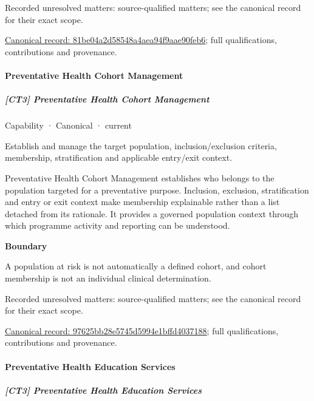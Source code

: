 {\small Recorded unresolved matters: source-qualified matters; see the canonical record for their exact scope.}\par
{\footnotesize \href{../../../../continuum/strategy/capability/81be04a2d58548a4aea94f9aae90feb6.md}{Canonical record: 81be04a2d58548a4aea94f9aae90feb6}; full qualifications, contributions and provenance.}\par
\paragraph{Preventative Health Cohort Management}

\subparagraph{[CT3] Preventative Health Cohort Management}

\label{element:97625bb28e5745d5994e1bffd4037188}
{\small Capability · Canonical · current}\par

Establish and manage the target population, inclusion/exclusion criteria, membership, stratification and applicable entry/exit context.



Preventative Health Cohort Management establishes who belongs to the population targeted for a preventative purpose. Inclusion, exclusion, stratification and entry or exit context make membership explainable rather than a list detached from its rationale. It provides a governed population context through which programme activity and reporting can be understood.



\textbf{Boundary}



A population at risk is not automatically a defined cohort, and cohort membership is not an individual clinical determination.


{\small Recorded unresolved matters: source-qualified matters; see the canonical record for their exact scope.}\par
{\footnotesize \href{../../../../continuum/strategy/capability/97625bb28e5745d5994e1bffd4037188.md}{Canonical record: 97625bb28e5745d5994e1bffd4037188}; full qualifications, contributions and provenance.}\par
\paragraph{Preventative Health Education Services}

\subparagraph{[CT3] Preventative Health Education Services}

